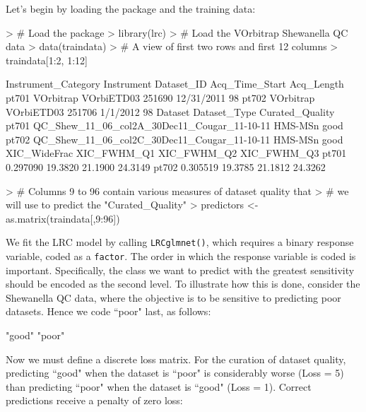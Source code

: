 \documentclass{article}
\begin{document}
Let's begin by loading the package and the training data:
\begin{Schunk}
\begin{Sinput}
> # Load the package
> library(lrc)
> # Load the VOrbitrap Shewanella QC data
> data(traindata)
> # A view of first two rows and first 12 columns
> traindata[1:2, 1:12]
\end{Sinput}
\begin{Soutput}
      Instrument_Category Instrument Dataset_ID Acq_Time_Start Acq_Length
pt701           VOrbitrap VOrbiETD03     251690     12/31/2011         98
pt702           VOrbitrap VOrbiETD03     251706       1/1/2012         98
                                          Dataset Dataset_Type Curated_Quality
pt701 QC_Shew_11_06_col2A_30Dec11_Cougar_11-10-11      HMS-MSn            good
pt702 QC_Shew_11_06_col2C_30Dec11_Cougar_11-10-11      HMS-MSn            good
      XIC_WideFrac XIC_FWHM_Q1 XIC_FWHM_Q2 XIC_FWHM_Q3
pt701     0.297090     19.3820     21.1900     24.3149
pt702     0.305519     19.3785     21.1812     24.3262
\end{Soutput}
\begin{Sinput}
> # Columns 9 to 96 contain various measures of dataset quality that
> # we will use to predict the "Curated_Quality"
> predictors <- as.matrix(traindata[,9:96])
\end{Sinput}
\end{Schunk}

\noindent We fit the LRC model by calling {\tt LRCglmnet()}, which 
requires a binary response variable, coded
as a {\tt factor}.  The order in which the response variable
is coded is important.  Specifically, the class we want to predict with
the greatest sensitivity should be encoded as the second level. To illustrate how this
is done, consider the Shewanella QC data, where the objective is to be
sensitive to predicting poor datasets.  Hence we code ``poor" last, as follows:
\begin{Schunk}
\begin{Soutput}
[1] "good" "poor"
\end{Soutput}
\end{Schunk}
\noindent Now we must define a discrete loss matrix. For the curation
of dataset quality, predicting ``good" when the dataset is ``poor" is considerably 
worse (Loss = 5) than predicting ``poor" when the dataset
is ``good" (Loss = 1).  Correct predictions receive a penalty of zero loss:
\end{document}
